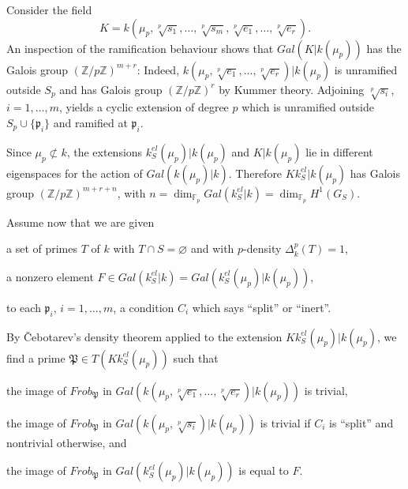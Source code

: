 \documentclass[10pt]{article}
\newcommand{\Z}{{\mathbb Z}}
\newcommand{\F}{{\mathbb F}}
\newcommand{\Frob}{{\mathit{Frob}}}
\newcommand{\p}{{\mathfrak p}}
\renewcommand{\P}{\mathfrak{P}}
\theoremstyle{alex}
\theoremstyle{alexdef}
\begin{document}
\medskip
Consider the field
\[
K= k(\mu_p, \sqrt[p]{s_1},  \ldots, \sqrt[p]{s_m},  \sqrt[p]{e_1},  \ldots, \sqrt[p]{e_r}).
\]
An inspection of the ramification behaviour shows that $Gal(K|k(\mu_p))$ has the Galois group
$(\Z/p\Z)^{m+r}$: Indeed, $k(\mu_p,\sqrt[p]{e_1}, \ldots, \sqrt[p]{e_r})|k(\mu_p)$  is unramified outside $S_p$ and has Galois group $(\Z/p\Z)^{r}$ by Kummer theory. Adjoining $\sqrt[p]{s_i}$, $i=1,\ldots,m$, yields a cyclic extension of degree $p$ which is unramified outside $S_p\cup \{\p_i\}$ and ramified at $\p_i$.

Since $\mu_p\not\subset k$, the extensions $k_S^{el}(\mu_p)|k(\mu_p)$ and $K|k(\mu_p)$ lie in different eigenspaces for the action of $Gal(k(\mu_p)|k)$. Therefore  $Kk_S^{el}|k(\mu_p)$ has Galois group $(\Z/p\Z)^{m+r+n}$, with
$n=\dim_{\F_p} Gal(k_S^{el}|k)=\dim_{\F_p}H^1(G_S)$.

\medskip
Assume now that we are given

\medskip\noindent
\begin{compactitem}
\item a set of primes $T$ of $k$ with $T \cap S =\varnothing$ and with $p$-density $\varDelta_k^p(T)=1$,
\item a nonzero element
$F\in Gal(k_S^{el}|k)=Gal(k_S^{el}(\mu_p)|k(\mu_p))$,

\item to each $\p_i$, $i=1,\ldots,m$, a condition $C_i$ which says ``split'' or ``inert''.
\end{compactitem}


\medskip\noindent
By \v Cebotarev's density theorem applied to the extension $Kk_S^{el}(\mu_p)|k(\mu_p)$, we find a prime $\P \in T(Kk_S^{el}(\mu_p))$ such that

\medskip\noindent
\begin{compactitem}
\item the image of $\Frob_\P$ in $Gal({k(\mu_p,   \sqrt[p]{e_1}, \ldots, \sqrt[p]{e_r})|k(\mu_p)})$ is trivial,
\item the image of $\Frob_\P$ in $Gal({k(\mu_p, \sqrt[p]{s_i})|k(\mu_p)})$ is trivial if $C_i$ is ``split'' and nontrivial otherwise, and
\item the image of $\Frob_\P$ in $Gal(k_S^{el}(\mu_p)|k(\mu_p))$ is equal to $F$.
\end{compactitem}
\end{document}
